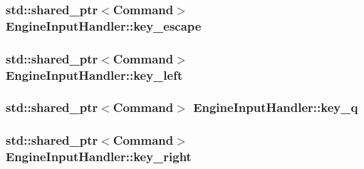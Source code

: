 \subsubsection[{key\+\_\+escape}]{\setlength{\rightskip}{0pt plus 5cm}std\+::shared\+\_\+ptr$<${\bf Command}$>$ Engine\+Input\+Handler\+::key\+\_\+escape\hspace{0.3cm}{\ttfamily [private]}}\label{class_engine_input_handler_a864479881a1e214952f4a2aea3a307bf}
\hypertarget{class_engine_input_handler_ae23b9a5cdfe4e076ca5337e5e4e17100}{}
\subsubsection[{key\+\_\+left}]{\setlength{\rightskip}{0pt plus 5cm}std\+::shared\+\_\+ptr$<${\bf Command}$>$ Engine\+Input\+Handler\+::key\+\_\+left\hspace{0.3cm}{\ttfamily [private]}}\label{class_engine_input_handler_ae23b9a5cdfe4e076ca5337e5e4e17100}
\hypertarget{class_engine_input_handler_a87304a132a8502abc0d4b74abf104bfe}{}
\subsubsection[{key\+\_\+q}]{\setlength{\rightskip}{0pt plus 5cm}std\+::shared\+\_\+ptr$<${\bf Command}$>$ Engine\+Input\+Handler\+::key\+\_\+q\hspace{0.3cm}{\ttfamily [private]}}\label{class_engine_input_handler_a87304a132a8502abc0d4b74abf104bfe}
\hypertarget{class_engine_input_handler_ad74ef644e2130ed5552173993a358b20}{}
\subsubsection[{key\+\_\+right}]{\setlength{\rightskip}{0pt plus 5cm}std\+::shared\+\_\+ptr$<${\bf Command}$>$ Engine\+Input\+Handler\+::key\+\_\+right\hspace{0.3cm}{\ttfamily [private]}}\label{class_engine_input_handler_ad74ef644e2130ed5552173993a358b20}
\hypertarget{class_engine_input_handler_ac8cb7f400955f76a2258a64f0812c309}{}
